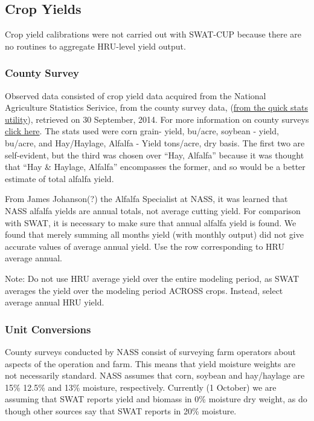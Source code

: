 \subsection{Crop Yields}
Crop yield calibrations were not carried out with SWAT-CUP because there are no
routines to aggregate HRU-level yield output.
	\subsubsection{County Survey}
Observed data consisted of crop yield data acquired from the National
Agriculture Statistics Serivice, from the county survey data,
(\href{http://quickstats.nass.usda.gov/results/CD8890FD-566F-3F66-8C8A-CB932E358991}{from
the quick stats utility}), retrieved on 30 September, 2014. For more information
on county surveys
\href{http://www.nass.usda.gov/Surveys/Guide_to_NASS_Surveys/County_Agricultural_Production/index.asp}{click
here}. The stats used were corn grain- yield, bu/acre, soybean - yield, bu/acre,
and Hay/Haylage, Alfalfa - Yield tons/acre, dry basis. The first two are
self-evident, but the third was chosen over ``Hay, Alfalfa'' because it was
thought that ``Hay \& Haylage, Alfalfa'' encompasses the former, and so would be
a better estimate of total alfalfa yield.
	
From James Johanson(?) the Alfalfa Specialist at NASS, it was learned that NASS
alfalfa yields  are annual totals, not average cutting yield. For comparison
with SWAT, it is necessary to make sure that annual alfalfa yield is found. We
found that merely summing all months yield (with monthly output) did not give
accurate values of average annual yield. Use the row corresponding to HRU
average annual.
	
Note: Do not use HRU average yield over the entire modeling period, as SWAT
averages the yield over the modeling period ACROSS crops. Instead, select
average annual HRU yield.

	\subsubsection{Unit Conversions}
County surveys conducted by NASS consist of surveying farm operators about
aspects of the operation and farm. This means that yield moisture weights are
not necessarily standard. NASS assumes that corn, soybean and hay/haylage are
15\% 12.5\% and 13\% moisture, respectively.
Currently (1 October) we are assuming that SWAT reports yield and biomass in 0\%
moisture dry weight, as do \citet{almendinger_contructingsunrise_2010} though
other sources \citep{srinivasan_swatungauged_2010} say that SWAT reports in 20\%
moisture.

